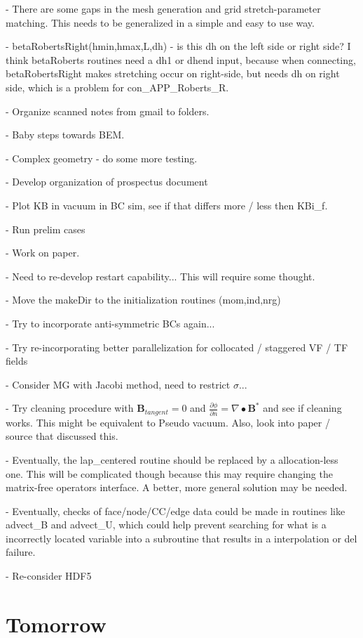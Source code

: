 \documentclass[11pt]{article}
\begin{document}
- There are some gaps in the mesh generation and grid stretch-parameter matching. This needs to be generalized in a simple and easy to use way.

- betaRobertsRight(hmin,hmax,L,dh) - is this dh on the left side or right side? I think betaRoberts routines need a dh1 or dhend input, because when connecting, betaRobertsRight makes stretching occur on right-side, but needs dh on right side, which is a problem for con\_APP\_Roberts\_R.

- Organize scanned notes from gmail to folders.

- Baby steps towards BEM.

- Complex geometry - do some more testing.

- Develop organization of prospectus document

- Plot KB in vacuum in BC sim, see if that differs more / less then KBi\_f.

- Run prelim cases

- Work on paper.

- Need to re-develop restart capability... This will require some thought.

- Move the makeDir to the initialization routines (mom,ind,nrg)

- Try to incorporate anti-symmetric BCs again...

- Try re-incorporating better parallelization for collocated / staggered VF / TF fields

- Consider MG with Jacobi method, need to restrict $\sigma$...

- Try cleaning procedure with $\mathbf{B}_{tangent}=0$ and $\frac{\partial \phi}{\partial n} = \nabla \bullet \mathbf{B}^*$ and see if cleaning works. This might be equivalent to Pseudo vacuum. Also, look into paper / source that discussed this.


- Eventually, the lap\_centered routine should be replaced by a allocation-less one. This will be complicated though because this may require changing the matrix-free operators interface. A better, more general solution may be needed.

- Eventually, checks of face/node/CC/edge data could be made in routines like advect\_B and advect\_U, which could help prevent searching for what is a incorrectly located variable into a subroutine that results in a interpolation or del failure.

- Re-consider HDF5

\section{Tomorrow}
\end{document}
